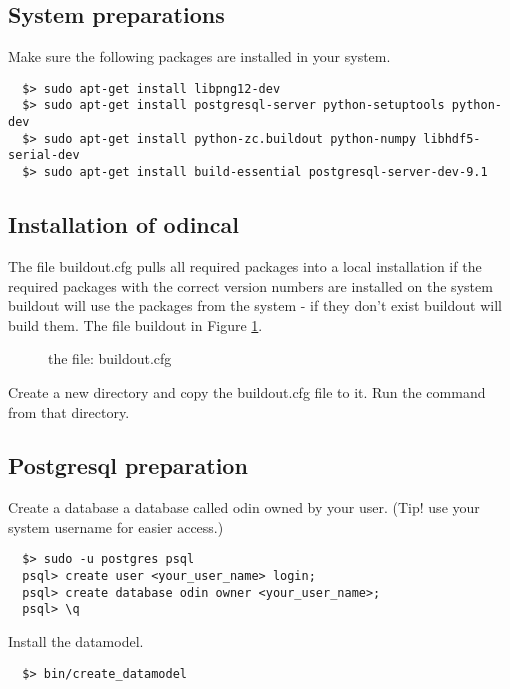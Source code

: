 \subsection{System preparations}
Make sure the following packages are installed in your system.
\begin{verbatim}  
  $> sudo apt-get install libpng12-dev
  $> sudo apt-get install postgresql-server python-setuptools python-dev
  $> sudo apt-get install python-zc.buildout python-numpy libhdf5-serial-dev
  $> sudo apt-get install build-essential postgresql-server-dev-9.1
\end{verbatim}

\subsection{Installation of odincal}

The file buildout.cfg pulls all required packages into a local installation if the required packages with the correct version numbers are installed on the system buildout will use the packages from the system - if they don't exist buildout will build them. The file buildout in Figure \ref{buildout}.

\begin{figure}
\caption{the file: buildout.cfg}
\label{buildout}
\end{figure}

Create a new directory and copy the  buildout.cfg file to it. Run the command  from that directory.


\subsection{Postgresql preparation}
Create a database a database called odin owned by your user. (Tip! use your system username for easier access.)
  
\begin{verbatim}  
  $> sudo -u postgres psql
  psql> create user <your_user_name> login;
  psql> create database odin owner <your_user_name>;
  psql> \q
\end{verbatim}

Install the datamodel.

\begin{verbatim}  
  $> bin/create_datamodel
\end{verbatim}

